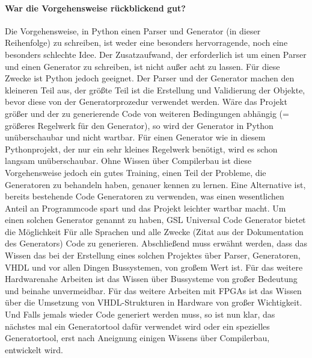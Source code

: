 \documentclass{article}
\newcommand{\nl}{\leavevmode\newline}
\begin{document}
\paragraph{War die Vorgehensweise rückblickend gut?}\nl
Die Vorgehensweise, in Python einen Parser und Generator (in dieser Reihenfolge) zu schreiben, ist weder eine besonders hervorragende, noch eine besonders schlechte Idee. Der Zusatzaufwand, der erforderlich ist um einen Parser und einen Generator zu schreiben, ist nicht außer acht zu lassen. Für diese Zwecke ist Python jedoch geeignet. Der Parser und der Generator machen den kleineren Teil aus, der größte Teil ist die Erstellung und Validierung der Objekte, bevor diese von der Generatorprozedur verwendet werden. Wäre das Projekt größer und der zu generierende Code von weiteren Bedingungen abhängig (= größeres Regelwerk für den Generator), so wird der Generator in Python unüberschaubar und nicht wartbar. Für einen Generator wie in diesem Pythonprojekt, der nur ein sehr kleines Regelwerk benötigt, wird es schon langsam unüberschaubar. Ohne Wissen über Compilerbau ist diese Vorgehensweise jedoch ein gutes Training, einen Teil der Probleme, die Generatoren zu behandeln haben, genauer kennen zu lernen.
Eine Alternative ist, bereits bestehende Code Generatoren zu verwenden, was einen wesentlichen Anteil an Programmcode spart und das Projekt leichter wartbar macht. Um einen solchen Generator genannt zu haben, \glqq GSL Universal Code Generator \grqq bietet die Möglichkeit \glqq Für alle Sprachen und alle Zwecke \grqq (Zitat aus der Dokumentation des Generators) Code zu generieren.
\nl\nl
Abschließend muss erwähnt werden, dass das Wissen das bei der Erstellung eines solchen Projektes über Parser, Generatoren, VHDL und vor allen Dingen Bussystemen, von großem Wert ist. Für das weitere Hardwarenahe Arbeiten ist das Wissen über Bussysteme von großer Bedeutung und beinahe unvermeidbar. Für das weitere Arbeiten mit FPGAs ist das Wissen über die Umsetzung von VHDL-Strukturen in Hardware von großer Wichtigkeit. Und Falls jemals wieder Code generiert werden muss, so ist nun klar, das nächstes mal ein Generatortool dafür verwendet wird oder ein spezielles Generatortool, erst nach Aneignung einigen Wissens über Compilerbau, entwickelt wird.
\end{document}
